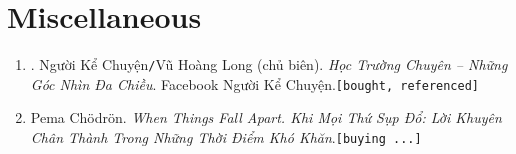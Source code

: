 \documentclass{article}
\numberwithin{equation}{section}
\begin{document}

\section{Miscellaneous}
\begin{enumerate}
	\item \cite{Nguoi_Ke_Chuyen_2021}. Người Kể Chuyện\texttt{/}Vũ Hoàng Long (chủ biên). \textit{Học Trường Chuyên -- Những Góc Nhìn Đa Chiều}. Facebook Người Kể Chuyện.\hfill\texttt{[bought, referenced]}
	\item Pema Ch\"odr\"on. \textit{When Things Fall Apart. Khi Mọi Thứ Sụp Đổ: Lời Khuyên Chân Thành Trong Những Thời Điểm Khó Khăn}.\hfill\texttt{[buying ...]}
\end{enumerate}


\printbibliography[heading=bibintoc]
	
\end{document}
